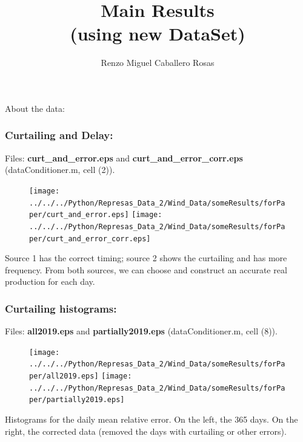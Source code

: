 \documentclass[aspectratio=169]{beamer}\usepackage[utf8]{inputenc}
\title{Main Results\\
(using new DataSet)}
\subtitle{Renzo Miguel Caballero Rosas}
\begin{document}
\begin{frame}
\titlepage
\end{frame}


\begin{frame}

{\Huge About the data:}

\end{frame}


\begin{frame}\frametitle{Curtailing and Delay:}
Files: \textbf{curt\_and\_error.eps} and \textbf{curt\_and\_error\_corr.eps} (dataConditioner.m, cell (2)).
\begin{figure}[ht!]
\centering
\texttt{[image: ../../../Python/Represas\_Data\_2/Wind\_Data/someResults/forPaper/curt\_and\_error.eps]}\quad\quad
\texttt{[image: ../../../Python/Represas\_Data\_2/Wind\_Data/someResults/forPaper/curt\_and\_error\_corr.eps]}
\end{figure}

Source 1 has the correct timing; source 2 shows the curtailing and has more frequency. From both sources, we can choose and construct an accurate real production for each day.

\end{frame}


\begin{frame}\frametitle{Curtailing histograms:}
Files: \textbf{all2019.eps} and \textbf{partially2019.eps} (dataConditioner.m, cell (8)).
\begin{figure}[ht!]
\centering
\texttt{[image: ../../../Python/Represas\_Data\_2/Wind\_Data/someResults/forPaper/all2019.eps]}\quad\quad
\texttt{[image: ../../../Python/Represas\_Data\_2/Wind\_Data/someResults/forPaper/partially2019.eps]}
\end{figure}

Histograms for the daily mean relative error. On the left, the 365 days. On the right, the corrected data (removed the days with curtailing or other errors).

\end{frame}
\end{document}
